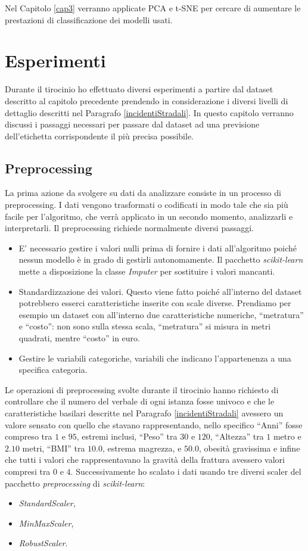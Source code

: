 \documentclass[12pt,italian]{report}
\begin{document}
Nel Capitolo \ref{cap3} verranno applicate PCA e t-SNE per cercare di aumentare le prestazioni di classificazione dei modelli usati.



% 
% 

\chapter{Esperimenti}
\label{Esperimenti}
Durante il tirocinio ho effettuato diversi esperimenti a partire dal dataset descritto al capitolo precedente prendendo in considerazione i diversi livelli di dettaglio descritti nel Paragrafo \ref{incidentiStradali}.
In questo capitolo verranno discussi i passaggi necessari per passare dal dataset ad una previsione dell'etichetta corrispondente il più precisa possibile.
\section{Preprocessing}
\label{preprocessing}
La prima azione da svolgere su dati da analizzare consiste in un processo di preprocessing. I dati vengono trasformati o codificati in modo tale che sia più facile per l'algoritmo, che verrà applicato in un secondo momento,  analizzarli e interpretarli.
Il preprocessing richiede normalmente diversi passaggi.
\begin{itemize}
	\item E' necessario gestire i valori nulli prima di fornire i dati all'algoritmo poiché nessun modello è in grado di gestirli autonomamente. Il pacchetto \emph{scikit-learn} mette a disposizione la classe \emph{Imputer} per sostituire i valori mancanti.
	\item Standardizzazione dei valori. Questo viene fatto poiché all'interno del dataset potrebbero esserci caratteristiche inserite con scale diverse. Prendiamo per esempio un dataset con all'interno due caratteristiche numeriche, ``metratura'' e ``costo'': non sono sulla stessa scala, ``metratura'' si misura in metri quadrati, mentre ``costo'' in euro. 
	\item Gestire le variabili categoriche, variabili che indicano l'appartenenza a una specifica categoria.
\end{itemize}
Le operazioni di preprocessing svolte durante il tirocinio hanno richiesto di controllare che il numero del verbale di ogni istanza fosse univoco e che le caratteristiche basilari descritte nel Paragrafo \ref{incidentiStradali} avessero un valore sensato con quello che stavano rappresentando, nello specifico ``Anni'' fosse compreso tra $1$ e $95$, estremi inclusi, ``Peso'' tra $30$ e $120$, ``Altezza'' tra $1$ metro e $2.10$ metri, ``BMI'' tra $10.0$, estrema magrezza, e $50.0$, obesità gravissima e infine che tutti i valori che rappresentavano la gravità della frattura avessero valori compresi tra $0$ e $4$.  Successivamente ho scalato i dati usando tre diversi scaler del pacchetto \emph{preprocessing} di \emph{scikit-learn}:
\begin{itemize}
	\item \emph{StandardScaler},
	\item \emph{MinMaxScaler},
	\item \emph{RobustScaler}.
\end{itemize} 
\end{document}
